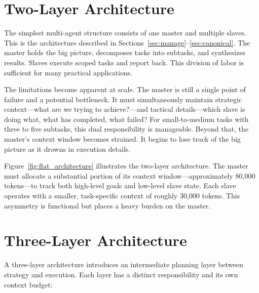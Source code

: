 \section{Two-Layer Architecture}\label{sec:two_layer}

The simplest multi-agent structure consists of one master and multiple slaves. This is the architecture described in Sections~\ref{sec:manage}--\ref{sec:canonical}. The master holds the big picture, decomposes tasks into subtasks, and synthesizes results. Slaves execute scoped tasks and report back. This division of labor is sufficient for many practical applications.

The limitations become apparent at scale. The master is still a single point of failure and a potential bottleneck. It must simultaneously maintain strategic context—what are we trying to achieve?—and tactical details—which slave is doing what, what has completed, what failed? For small-to-medium tasks with three to five subtasks, this dual responsibility is manageable. Beyond that, the master's context window becomes strained. It begins to lose track of the big picture as it drowns in execution details.

Figure~\ref{fig:flat_architecture} illustrates the two-layer architecture. The master must allocate a substantial portion of its context window—approximately 80,000 tokens—to track both high-level goals and low-level slave state. Each slave operates with a smaller, task-specific context of roughly 30,000 tokens. This asymmetry is functional but places a heavy burden on the master.

\section{Three-Layer Architecture}\label{sec:three_layer}

A three-layer architecture introduces an intermediate planning layer between strategy and execution. Each layer has a distinct responsibility and its own context budget:

